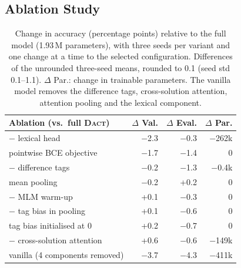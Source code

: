 \documentclass[11pt]{article}
\newcommand{\dact}{\textsc{Dact}}
\begin{document}
\subsection{Ablation Study}\label{sec:ablation}
\begin{table}[t]
\centering\small
\setlength{\tabcolsep}{4pt}
\begin{tabular}{@{}lrrr@{}}
\toprule
Ablation (vs.\ full \dact{}) & $\Delta$ Val. & $\Delta$ Eval. & $\Delta$ Par. \\
\midrule
$-$ lexical head & $-$2.3 & $-$0.3 & $-$262k \\
pointwise BCE objective & $-$1.7 & $-$1.4 & 0 \\
$-$ difference tags & $-$0.2 & $-$1.3 & $-$0.4k \\
mean pooling & $-$0.2 & +0.2 & 0 \\
$-$ MLM warm-up & +0.1 & $-$0.3 & 0 \\
$-$ tag bias in pooling & +0.1 & $-$0.6 & 0 \\
tag bias initialised at 0 & +0.2 & $-$0.7 & 0 \\
$-$ cross-solution attention & +0.6 & $-$0.6 & $-$149k \\
\midrule
vanilla (4 components removed) & $-$3.7 & $-$4.3 & $-$411k \\
\bottomrule
\end{tabular}
\caption{Change in accuracy (percentage points) relative to the full model (1.93\,M parameters), with three seeds per variant and one change at a time to the selected configuration. Differences of the unrounded three-seed means, rounded to 0.1 (seed std 0.1--1.1). $\Delta$ Par.: change in trainable parameters. The vanilla model removes the difference tags, cross-solution attention, attention pooling and the lexical component.}
\label{tab:abl}
\end{table}
\end{document}
